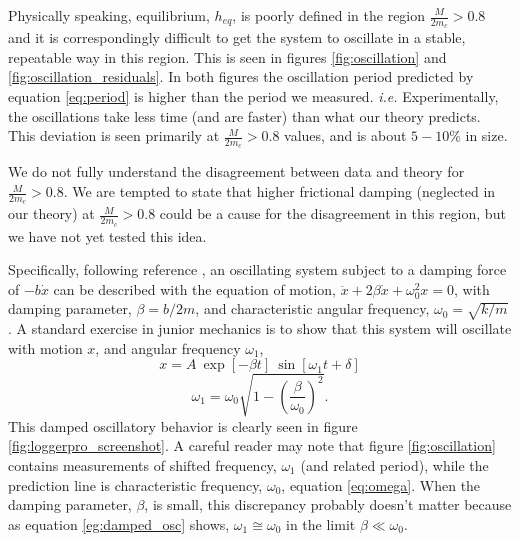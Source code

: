 \documentclass[12pt]{iopart}
\newcommand{\be}{\begin{equation}}
\newcommand{\ee}{\end{equation}}
\begin{document}

Physically speaking, equilibrium, $h_{eq}$, is poorly defined in the region $\frac{M}{2m_c}>0.8$ and it is correspondingly difficult to get the system to oscillate in a stable, repeatable way in this region.  This is seen in  figures \ref{fig:oscillation} and \ref{fig:oscillation_residuals}.  In both figures the oscillation period predicted by equation \ref{eq:period} is higher than the period we measured. \textit{i.e.} Experimentally, the oscillations take less time (and are faster) than what our theory predicts.  This deviation is seen primarily at $\frac{M}{2m_c}>0.8$ values, and is about $5-10\%$ in size.  

We do not fully understand the disagreement between data and theory for $\frac{M}{2m_c}>0.8$. We are tempted to state that  higher frictional damping (neglected in our theory) at $\frac{M}{2m_c}>0.8$ could be a cause for the disagreement  in this region, but we have not yet tested this idea.  


%
%
Specifically, following reference \cite{Mechanics_reference}, an oscillating system subject to a damping force of $-b\dot{x}$ can be described with the equation of motion,
$\ddot{x} + 2 \beta \dot{x} + \omega_0^2 x = 0$,
with damping parameter, $\beta=b/2m$, 
and characteristic angular frequency, $\omega_0=\sqrt{k/m}$.
A standard exercise in junior mechanics is to show that this system will oscillate with motion $x$, and angular frequency $\omega_1$,
\be
x = A~\exp\left[-\beta t\right] ~\sin\left[ \omega_1 t+\delta \right]
\label{eq:damped_osc_y}
\ee
\be
\omega_1 = \omega_0 \sqrt{1 - \left( \frac{\beta}{\omega_0} \right)^2 }.
\label{eg:damped_osc}
\ee
This damped oscillatory behavior is clearly seen in figure \ref{fig:loggerpro_screenshot}.  A careful reader may note that figure \ref{fig:oscillation} contains measurements of shifted frequency, $\omega_1$ (and related period), while the prediction line is characteristic frequency, $\omega_0$, equation \ref{eq:omega}.  When the damping parameter, $\beta$, is  small, this discrepancy probably doesn't matter because as equation \ref{eg:damped_osc} shows, $\omega_1 \cong \omega_0$ in the limit $\beta\ll \omega_0$.
\end{document}
